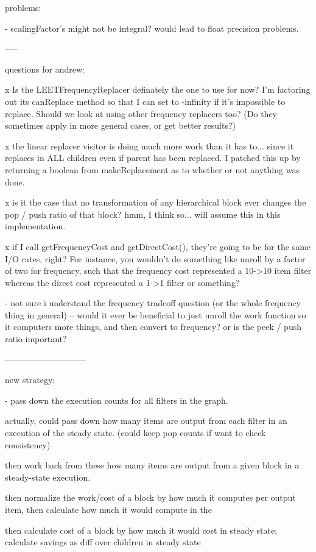 problems:

- scalingFactor's might not be integral? would lead to float precision problems.

-----

questions for andrew:

x Is the LEETFrequencyReplacer definately the one to use for now?  I'm
  factoring out its canReplace method so that I can set to -infinity
  if it's impossible to replace.  Should we look at using other
  frequency replacers too?  (Do they sometimes apply in more general
  cases, or get better results?)

x the linear replacer visitor is doing much more work than it has
  to... since it replaces in ALL children even if parent has been
  replaced.  I patched this up by returning a boolean from
  makeReplacement as to whether or not anything was done.

x is it the case that no transformation of any hierarchical block ever
  changes the pop / push ratio of that block?  hmm, I think so... will
  assume this in this implementation.

x if I call getFrequencyCost and getDirectCost(), they're going to be
  for the same I/O rates, right?  For instance, you wouldn't do
  something like unroll by a factor of two for frequency, such that
  the frequency cost represented a 10->10 item filter whereas the
  direct cost represented a 1->1 filter or something?

- not sure i understand the frequency tradeoff question (or the whole
  frequency thing in general) -- would it ever be beneficial to just
  unroll the work function so it computers more things, and then
  convert to frequency?  or is the peek / push ratio important?

-----------------------------

new strategy:

- pass down the execution counts for all filters in the graph.  

  actually, could pass down how many items are output from each filter
  in an execution of the steady state.  (could keep pop counts if want
  to check consistency)

  then work back from these how many items are output from a given
  block in a steady-state execution.

  then normalize the work/cost of a block by how much it computes per
  output item, then calculate how much it would compute in the

  then calculate cost of a block by how much it would cost in steady
  state; calculate savings as diff over children in steady state

